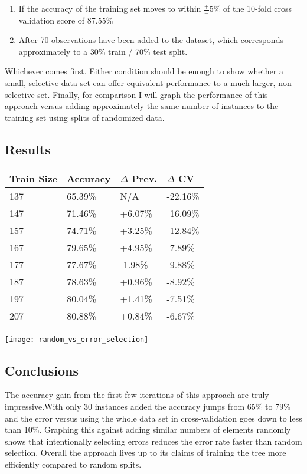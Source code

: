 \documentclass[11pt, letterpaper]{report}
\begin{document}
\begin{enumerate}
    \item{If the accuracy of the training set moves to within $\frac{+}{-}5\%$ of the 10-fold cross validation score of 87.55\%}
    \item{After 70 observations have been added to the dataset, which corresponds approximately to a 30\% train / 70\% test split.}
\end{enumerate}

Whichever comes first. Either condition should be enough to show whether a small, selective data set can offer equivalent performance to a much larger, non-selective set. Finally, for comparison I will graph the performance of this approach versus adding approximately the same number of instances to the training set using splits of randomized data.

\subsection{Results}

\begin{tabular}{ |l|l|l|l| }
    \hline
    \textbf{Train Size} & \textbf{Accuracy} & \textbf{$\Delta$ Prev.} & \textbf{$\Delta$ CV} \\ \hline
    137 & 65.39\% & N/A & -22.16\% \\
    147 & 71.46\% & +6.07\% & -16.09\% \\
    157 & 74.71\% & +3.25\% & -12.84\% \\
    167 & 79.65\% & +4.95\% & -7.89\% \\
    177 & 77.67\% & -1.98\% & -9.88\% \\
    187 & 78.63\% & +0.96\% & -8.92\% \\
    197 & 80.04\% & +1.41\% & -7.51\% \\
    207 & 80.88\% & +0.84\% & -6.67\% \\
    \hline
\end{tabular}

\bigskip
\texttt{[image: random\_vs\_error\_selection]}

\pagebreak
\subsection{Conclusions}

The accuracy gain from the first few iterations of this approach are truly impressive.With only 30 instances added the accuracy jumps from 65\% to 79\% and the error versus using the whole data set in cross-validation goes down to less than 10\%. Graphing this against adding similar numbers of elements randomly shows that intentionally selecting errors reduces the error rate faster than random selection. Overall the approach lives up to its claims of training the tree more efficiently compared to random splits.
\end{document}
